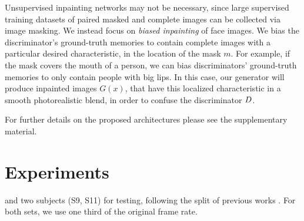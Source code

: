 \documentclass[10pt,twocolumn,letterpaper]{article}
\begin{document}
\begin{bibunit}[ieee]
Unsupervised inpainting networks \cite{DBLP:journals/corr/YehCLHD16}  may not be necessary, since large  supervised training datasets of paired masked and complete images can be  collected via image masking.     
We instead focus on \textit{biased inpainting} of face images.  
We bias the discriminator's ground-truth memories to contain complete images with a  particular desired characteristic, in the location of the mask $m$. For example, if the mask covers the mouth of a person, we  can bias discriminators' ground-truth memories  to only contain people with big lips. In this case, our generator will produce inpainted  images $G(x)$, that have this localized characteristic in a smooth photorealistic blend, in order to confuse the discriminator $D$.

For further details on the proposed architectures please see the supplementary material.
\section{Experiments}%
and two subjects (S9, S11) for testing, following the split of previous works  \cite{DBLP:journals/corr/ZhouZPLDD17}.
For both sets, we use one third of the original frame rate.


\end{bibunit}
\end{document}
